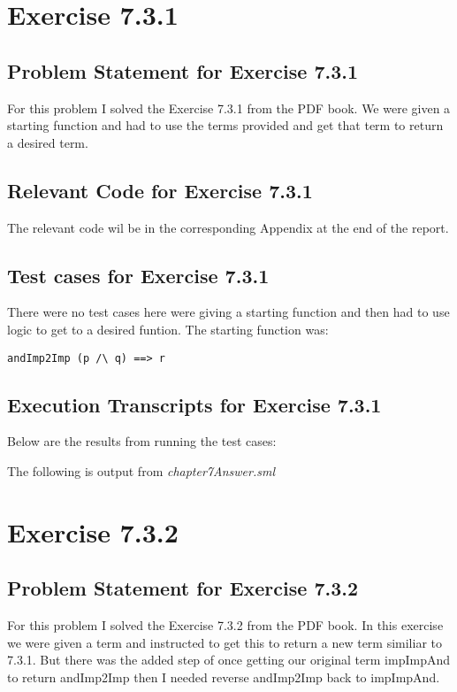 \documentclass{report}
\begin{document}
\chapter{Exercise 7.3.1}
\label{cha:exercise-7-3-1}

\section{Problem Statement for Exercise 7.3.1}
\label{sec:problem-statement-ex-7-3-1}
For this problem I solved the Exercise 7.3.1 from the PDF book. We
were given a starting function and had to use the terms provided and
get that term to return a desired term.

\section{Relevant Code for Exercise 7.3.1}
\label{sec:relevant-code-ex-7-3-1}
  The relevant code wil be in the corresponding Appendix at the
  end of the report.

\section{Test cases for Exercise 7.3.1}
\label{sec:tests-ex-7-3-1}
There were no test cases here were giving a starting function and then
had to use logic to get to a desired funtion. The starting function
was:
\begin{lstlisting}[frame=TBlr]
andImp2Imp (p /\ q) ==> r
\end{lstlisting}

\section{Execution Transcripts for Exercise 7.3.1}
\label{sec:exe-ex-7-3-1}
Below are the results from running the test cases:

The following is output from \emph{chapter7Answer.sml}


\chapter{Exercise 7.3.2}
\label{cha:exercise-7-3-2}

\section{Problem Statement for Exercise 7.3.2}
\label{sec:problem-statement-ex-7-3-2}
For this problem I solved the Exercise 7.3.2 from the PDF book. In
this exercise we were given a term and instructed to get this to
return a new term similiar to 7.3.1. But there was the added step of
once getting our original term impImpAnd to return andImp2Imp then I
needed reverse andImp2Imp back to impImpAnd.
\end{document}
